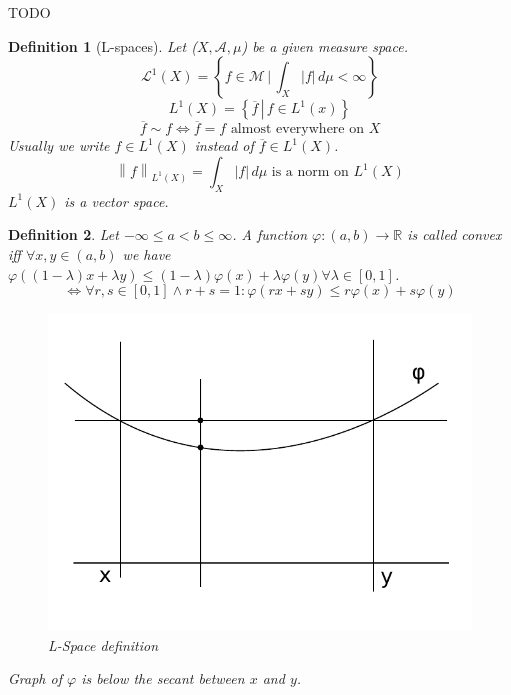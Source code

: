 \documentclass{article}
\newtheorem{definition}{Definition}  \numberwithin{definition}{section}
\newcommand{\setdef}[2]{\left\{\left.#1\,\right|\,#2\right\}}
\newcommand{\norm}[1]{\left\|#1\right\|}
\newcommand{\card}[1]{\left|#1\right|}
\begin{document}
TODO

\begin{definition}[L-spaces]
  Let ($X, \mathcal A, \mu$) be a given measure space.
  \[ {\mathcal L}^1(X) = \setdef{f \in \mathcal M}{\int_X \card{f} \, d\mu < \infty} \]
  \[ L^1(X) = \setdef{\overline{f}}{f \in L^1(x)} \]
  \[ \overline{f} \sim f \iff \overline{f} = f \text{ almost everywhere on } X \]
  Usually we write $f \in L^1(X)$ instead of $\overline{f} \in L^1(X)$.
  \[ \norm{f}_{L^1(X)} = \int_{X} \card{f} \, d\mu \text{ is a norm on } L^1(X) \]
  $L^1(X)$ is a vector space.
\end{definition}

\begin{definition}
  Let $-\infty \leq a < b \leq \infty$. A function $\varphi: (a, b) \to \mathbb R$
  is called \emph{convex} iff $\forall x, y \in (a,b)$ we have $\varphi((1 - \lambda)x + \lambda y) \leq (1 - \lambda) \varphi(x) + \lambda \varphi(y) \forall \lambda \in [0,1]$.
  \[ \iff \forall r,s \in [0,1] \land r + s = 1: \varphi(rx + sy) \leq r\varphi(x) + s\varphi(y) \]
  \begin{figure}[!h]
    \begin{center}
      \includegraphics{img/18_lspace_definition.pdf}
      \caption{L-Space definition}
    \end{center}
  \end{figure}
  Graph of $\varphi$ is below the secant between $x$ and $y$.
\end{definition}
\end{document}
